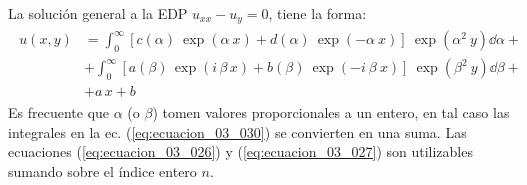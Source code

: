 La solución general a la EDP $u_{xx} - u_{y} = 0$, tiene la forma:
\begin{align}
\begin{aligned}
u(x, y) &=  \int_{0}^{\infty} \left[ c(\alpha) \: \exp(\alpha \: x) + d(\alpha) \: \exp(- \alpha \: x) \right] \: \exp(\alpha^{2} \: y) \dd{\alpha} + \\
&+ \int_{0}^{\infty} \left[ a(\beta) \, \exp(i \, \beta \, x) + b(\beta) \: \exp(- i \: \beta \: x) \right] \: \exp(\beta^{2} \: y) \dd{\beta} + \\
&+ a \, x + b
\end{aligned}
\label{eq:ecuacion_03_030}
\end{align}
Es frecuente que $\alpha$ (o $\beta$) tomen valores proporcionales a un entero, en tal caso las integrales en la ec. (\ref{eq:ecuacion_03_030}) se convierten en una suma. Las ecuaciones (\ref{eq:ecuacion_03_026}) y (\ref{eq:ecuacion_03_027}) son utilizables sumando sobre el índice entero $n$.
